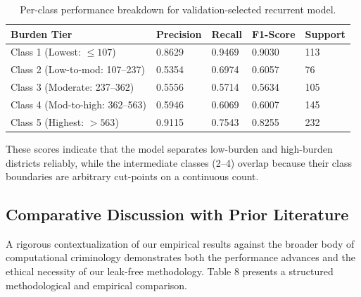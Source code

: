 \documentclass[runningheads]{llncs}
\begin{document}
\begin{table}[ht]
\caption{Per-class performance breakdown for validation-selected recurrent model.}
\centering
\begin{tabular}{lllll}
\toprule
Burden Tier & Precision & Recall & F1-Score & Support \\
\midrule
Class 1 (Lowest: $\le 107$) & 0.8629 & 0.9469 & 0.9030 & 113 \\
Class 2 (Low-to-mod: 107--237) & 0.5354 & 0.6974 & 0.6057 & 76 \\
Class 3 (Moderate: 237--362) & 0.5556 & 0.5714 & 0.5634 & 105 \\
Class 4 (Mod-to-high: 362--563) & 0.5946 & 0.6069 & 0.6007 & 145 \\
Class 5 (Highest: $> 563$) & 0.9115 & 0.7543 & 0.8255 & 232 \\
\bottomrule
\end{tabular}
\end{table}
These scores indicate that the model separates low-burden and high-burden districts reliably, while the intermediate classes (2--4) overlap because their class boundaries are arbitrary cut-points on a continuous count.

\subsection{Comparative Discussion with Prior Literature}
A rigorous contextualization of our empirical results against the broader body of computational criminology demonstrates both the performance advances and the ethical necessity of our leak-free methodology. Table 8 presents a structured methodological and empirical comparison.

\begin{table}[ht]
\caption{Direct Comparison of Methodological Standards with Prior Literature.}
\centering
{}
\end{table}
\end{document}
